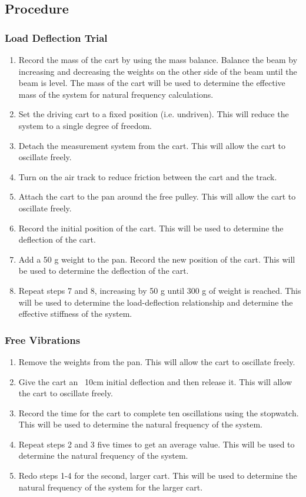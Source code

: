 \subsection{Procedure}
\subsubsection{Load Deflection Trial}

\begin{enumerate}
    \item Record the mass of the cart by using the mass balance. Balance the beam by increasing and decreasing the weights on the other side of the beam until the beam is level. The mass of the cart will be used to determine the effective mass of the system for natural frequency calculations.
    \item Set the driving cart to a fixed position (i.e. undriven). This will reduce the system to a single degree of freedom.
    \item Detach the measurement system from the cart. This will allow the cart to oscillate freely.
    \item Turn on the air track to reduce friction between the cart and the track.
    \item Attach the cart to the pan around the free pulley. This will allow the cart to oscillate freely.
    \item Record the initial position of the cart. This will be used to determine the deflection of the cart.
    \item Add a 50 g weight to the pan. Record the new position of the cart. This will be used to determine the deflection of the cart.
    \item Repeat steps 7 and 8, increasing by 50 g until 300 g of weight is reached. This will be used to determine the load-deflection relationship and determine the effective stiffness of the system.
\end{enumerate}

\subsubsection{Free Vibrations}
\begin{enumerate}
    \item Remove the weights from the pan. This will allow the cart to oscillate freely.
    \item Give the cart an ~10cm initial deflection and then release it. This will allow the cart to oscillate freely.
    \item Record the time for the cart to complete ten oscillations using the stopwatch. This will be used to determine the natural frequency of the system.
    \item Repeat steps 2 and 3 five times to get an average value. This will be used to determine the natural frequency of the system.
    \item Redo steps 1-4 for the second, larger cart. This will be used to determine the natural frequency of the system for the larger cart.
\end{enumerate}

